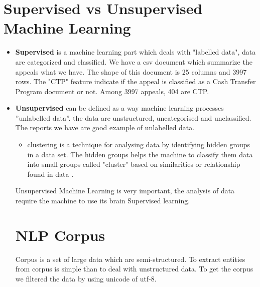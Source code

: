 \section{Supervised vs Unsupervised  Machine Learning}
\begin{itemize}
\item \textbf{Supervised} is a machine learning part which deals with "labelled data",  data are categorized and classified. We have a csv document which summarize
  the appeals what we have. The shape of this document is 25 columns and 3997 rows. The "CTP" feature indicate if the appeal is classified as a Cash
  Transfer Program document  or not. Among 3997 appeals, 404 are CTP.

\item \textbf{Unsupervised} can be defined as a way machine learning processes ”unlabelled data”.
the data are unstructured, uncategorised and unclassified. The reports we have are good example of unlabelled data.
\begin{itemize}
\item clustering is a technique for analysing data by identifying hidden groups in a data set. The hidden groups helps the machine to  classify them data into small groups called "cluster" based on similarities or relationship found in data \citep{dy2004feature}.
\end{itemize}
Unsupervised Machine Learning is very important, the analysis of data require the machine to use its brain Supervised learning.
\section{NLP Corpus}\label{re}
Corpus is a set of large data which are semi-structured.  To extract entities from corpus is simple
than to deal with unstructured data. To get the corpus we filtered the data by using unicode of utf-8.


\end{itemize}
